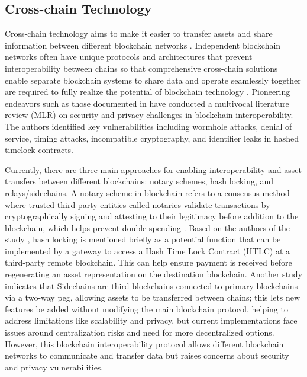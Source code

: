 \documentclass[sigconf]{acmart}
\begin{document}
\subsection{Cross-chain Technology}
Cross-chain technology aims to make it easier to transfer assets and share information between different blockchain networks \cite{han2023survey}. Independent blockchain networks often have unique protocols and architectures that prevent interoperability between chains so that comprehensive cross-chain solutions enable separate blockchain systems to share data and operate seamlessly together are required to fully realize the potential of blockchain technology \cite{hei2022practical}. Pioneering endeavors such as those documented in \cite{haugum2022security} have conducted a multivocal literature review (MLR) on security and privacy challenges in blockchain interoperability. The authors identified key vulnerabilities including wormhole attacks, denial of service, timing attacks, incompatible cryptography, and identifier leaks in hashed timelock contracts.

Currently, there are three main approaches for enabling interoperability and asset transfers between different blockchains: notary schemes, hash locking, and relays/sidechains. A notary scheme in blockchain refers to a consensus method where trusted third-party entities called notaries validate transactions by cryptographically signing and attesting to their legitimacy before addition to the blockchain, which helps prevent double spending \cite{qin2018overview}. Based on the authors of the study \cite{hardjono2021blockchain}, hash locking is mentioned briefly as a potential function that can be implemented by a gateway to access a Hash Time Lock Contract (HTLC) at a third-party remote blockchain. This can help ensure payment is received before regenerating an asset representation on the destination blockchain. Another study \cite{singh2020sidechain} indicates that Sidechains are third blockchains connected to primary blockchains via a two-way peg, allowing assets to be transferred between chains; this lets new features be added without modifying the main blockchain protocol, helping to address limitations like scalability and privacy, but current implementations face issues around centralization risks and need for more decentralized options. However, this blockchain interoperability protocol allows different blockchain networks to communicate and transfer data but raises concerns about security and privacy vulnerabilities.
\end{document}
